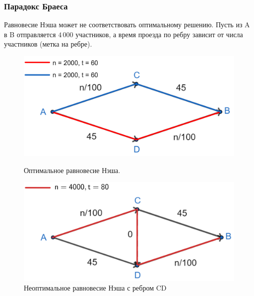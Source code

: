\documentclass{beamer}
\begin{document}
\begin{frame}\frametitle{Парадокс Браеса}
	Равновесие Нэша может не соответствовать оптимальному решению. Пусть из A в B отправляется $4\,000$ участников, а время проезда по ребру зависит от числа участников (метка на ребре).
	
	\begin{figure}[H]
		\begin{center}
			\begin{minipage}[h]{0.45\linewidth}
				\includegraphics[width=1\linewidth]{imgs/before_braess_short.png}
				\caption{Оптимальное равновесие Нэша.\newline}
				\label{ris:braess_1}
			\end{minipage}
			\hfill
			\begin{minipage}[h]{0.45\linewidth}
				\includegraphics[width=1\linewidth]{imgs/after_braess_short.png}
				\caption{Неоптимальное равновесие Нэша с ребром CD}
				\label{ris:braess_2}
			\end{minipage}
		\end{center}
	\end{figure}
	
\end{frame}
\end{document}

